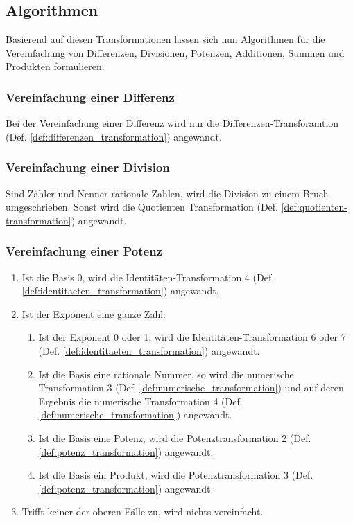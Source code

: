 \documentclass[11pt]{article}
\newcommand{\lab}[1]{(Def. \ref{#1})}
\begin{document}
\subsection{Algorithmen}

Basierend auf diesen Transformationen lassen sich nun Algorithmen für die Vereinfachung von
Differenzen, Divisionen, Potenzen, Additionen, Summen und Produkten formulieren.

\subsubsection{Vereinfachung einer Differenz}
Bei der Vereinfachung einer Differenz wird nur die Differenzen-Transforamtion \lab{def:differenzen_transformation}
angewandt.

\subsubsection{Vereinfachung einer Division}
Sind Zähler und Nenner rationale Zahlen, wird die Division zu einem Bruch umgeschrieben.
Sonst wird die Quotienten Transformation \lab{def:quotienten-transformation} angewandt.

\subsubsection{Vereinfachung einer Potenz}
\begin{enumerate}
  \item Ist die Basis 0, wird die Identitäten-Transformation 4 \lab{def:identitaeten_transformation} angewandt.
  \item Ist der Exponent eine ganze Zahl:
        \begin{enumerate}
          \item Ist der Exponent 0 oder 1, wird die Identitäten-Transformation 6 oder 7 
                \lab{def:identitaeten_transformation} angewandt.
          \item Ist die Basis eine rationale Nummer, so wird die numerische Transformation 3 
                \lab{def:numerische_transformation} und auf deren Ergebnis die numerische 
                Transformation 4 \lab{def:numerische_transformation} angewandt.
          \item Ist die Basis eine Potenz, wird die Potenztransformation 2 \lab{def:potenz_transformation} angewandt.
          \item Ist die Basis ein Produkt, wird die Potenztransformation 3 \lab{def:potenz_transformation} angewandt.
        \end{enumerate}
  \item Trifft keiner der oberen Fälle zu, wird nichts vereinfacht.
\end{enumerate}
\end{document}
